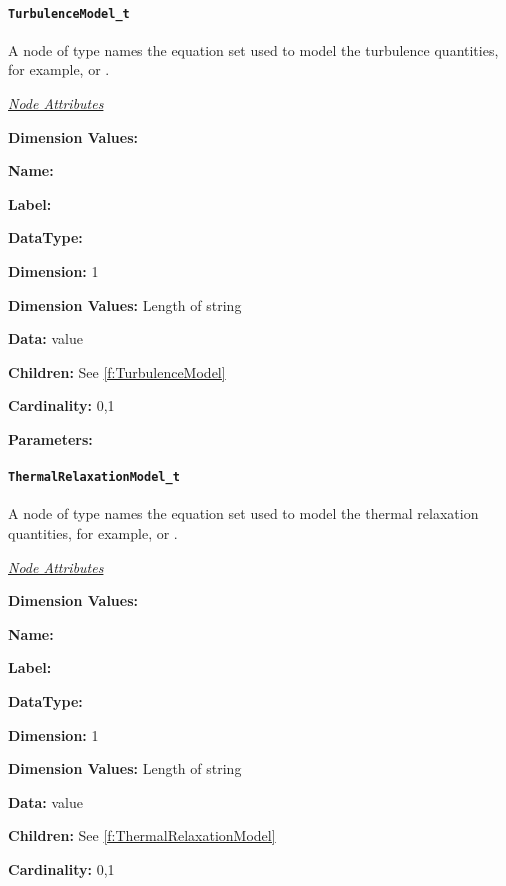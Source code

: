 \paragraph{\texttt{TurbulenceModel\_t}}

A node of type  names the equation
set used to model the turbulence quantities, for example,
 or .

\textit{\uline{Node Attributes}}
\begin{Ventryic}{\textbf{Dimension Values:}}
\item [\textbf{Name:}]
\item [\textbf{Label:}]
\item [\textbf{DataType:}]
\item [\textbf{Dimension:}]
      1
\item [\textbf{Dimension Values:}]
      Length of string
\item [\textbf{Data:}]
       value
\item [\textbf{Children:}]
      See \autoref{f:TurbulenceModel}
\item [\textbf{Cardinality:}]
      0,1
\item [\textbf{Parameters:}]
\end{Ventryic}

\paragraph{\texttt{ThermalRelaxationModel\_t}}

A node of type  names the equation
set used to model the thermal relaxation quantities, for example,
 or .

\textit{\uline{Node Attributes}}
\begin{Ventryic}{\textbf{Dimension Values:}}
\item [\textbf{Name:}]
\item [\textbf{Label:}]
\item [\textbf{DataType:}]
\item [\textbf{Dimension:}]
      1
\item [\textbf{Dimension Values:}]
      Length of string
\item [\textbf{Data:}]
       value
\item [\textbf{Children:}]
      See \autoref{f:ThermalRelaxationModel}
\item [\textbf{Cardinality:}]
      0,1
\end{Ventryic}

